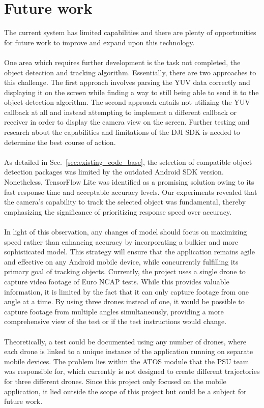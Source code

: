 \chapter{Future work}
The current system has limited capabilities and there are plenty of opportunities for future work to improve and expand upon this technology.
\\ \\
One area which requires further development is the task not completed, the object detection and tracking algorithm. Essentially, there are two approaches to this challenge. The first approach involves parsing the YUV data correctly and displaying it on the screen while finding a way to still being able to send it to the object detection algorithm.
The second approach entails not utilizing the YUV callback at all and instead attempting to implement a different callback or receiver in order to display the camera view on the screen. Further testing and research about the capabilities and limitations of the DJI SDK is needed to determine the best course of action.
\\ \\
As detailed in Sec.~\ref{sec:existing_code_base}, the selection of compatible object detection packages was limited by the outdated Android SDK version. Nonetheless, TensorFlow Lite was identified as a promising solution owing to its fast response time and acceptable accuracy levels. Our experiments revealed that the camera's capability to track the selected object was fundamental, thereby emphasizing the significance of prioritizing response speed over accuracy.
\\ \\
In light of this observation, any changes of model should focus on maximizing speed rather than enhancing accuracy by incorporating a bulkier and more sophisticated model. This strategy will ensure that the application remains agile and effective on any Android mobile device, while concurrently fulfilling its primary goal of tracking objects. Currently, the project uses a single drone to capture video footage of Euro NCAP tests. While this provides valuable information, it is limited by the fact that it can only capture footage from one angle at a time. By using three drones instead of one, it would be possible to capture footage from multiple angles simultaneously, providing a more comprehensive view of the test or if the test instructions would change.
\\ \\
Theoretically, a test could be documented using any number of drones, where each drone is linked to a unique instance of the application running on separate mobile devices. The problem lies within the ATOS module that the PSU team was responsible for, which currently is not designed to create different trajectories for three different drones. Since this project only focused on the mobile application, it lied outside the scope of this project but could be a subject for future work.